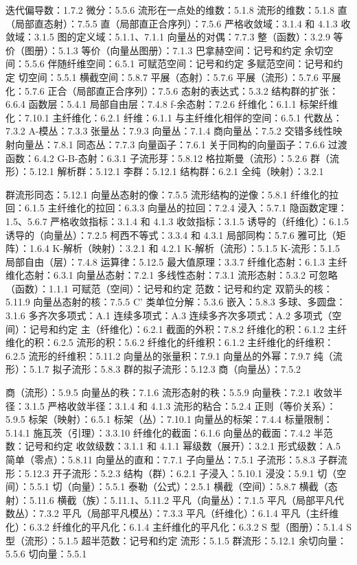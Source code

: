 迭代偏导数：1.7.2 微分：5.5.6 流形在一点处的维数：5.1.8 流形的维数：5.1.8 直（局部直态射）：7.5.5 直（局部直正合序列）：7.5.6 严格收敛域：3.1.4 和 4.1.3 收敛域：3.1.5 图的定义域：5.1.1、7.1.1 向量丛的对偶：7.7.3 整（函数）：3.2.9 等价（图册）：5.1.3 等价（向量丛图册）：7.1.3 巴拿赫空间：记号和约定 余切空间：5.5.6 伴随纤维空间：6.5.1 可赋范空间：记号和约定 多赋范空间：记号和约定 切空间：5.5.1 横截空间：5.8.7 平展（态射）：5.7.6 平展（流形）：5.7.6 平展化：5.7.6 正合（局部直正合序列）：7.5.6 态射的表达式：5.3.2 结构群的扩张：6.6.4 函数层：5.4.1 局部自由层：7.4.8 f-余态射：7.2.6 纤维化：6.1.1 标架纤维化：7.10.1 主纤维化：6.2.1 纤维：6.1.1 与主纤维化相伴的空间：6.5.1 代数丛：7.3.2 A-模丛：7.3.3 张量丛：7.9.3 向量丛：7.1.4 商向量丛：7.5.2 交错多线性映射向量丛：7.8.1 同态丛：7.7.3 向量函子：7.6.1 关于同构的向量函子：7.6.6 过渡函数：6.4.2 G-B-态射：6.3.1 子流形芽：5.8.12 格拉斯曼（流形）：5.2.6 群（流形）：5.12.1 解析群：5.12.1 李群：5.12.1 结构群：6.2.1 全纯（映射）：3.2.1

群流形同态：5.12.1 向量丛态射的像：7.5.5 流形结构的逆像：5.8.1 纤维化的拉回：6.1.5 主纤维化的拉回：6.3.3 向量丛的拉回：7.2.4 浸入：5.7.1 隐函数定理：1.5、5.6.7 严格收敛指标：3.1.4 和 4.1.3 收敛指标：3.1.5 诱导的（纤维化）：6.1.5 诱导的（向量丛）：7.2.5 柯西不等式：3.3.4 和 4.3.1 局部同构：5.7.6 雅可比（矩阵）：1.6.4 K-解析（映射）：3.2.1 和 4.2.1 K-解析（流形）：5.1.5 K-流形：5.1.5 局部自由（层）：7.4.8 运算律：5.12.5 最大值原理：3.3.7 纤维化态射：6.1.3 主纤维化态射：6.3.1 向量丛态射：7.2.1 多线性态射：7.3.1 流形态射：5.3.2 可忽略（函数）：1.1.1 可赋范（空间）：记号和约定 范数：记号和约定 双箭头的核：5.11.9 向量丛态射的核：7.5.5 C' 类单位分解：5.3.6 嵌入：5.8.3 多球、多圆盘：3.1.6 多齐次多项式：A.1 连续多项式：A.3 连续多齐次多项式：A.2 多项式（空间）：记号和约定 主（纤维化）：6.2.1 截面的外积：7.8.2 纤维化的积：6.1.2 主纤维化的积：6.2.5 流形的积：5.6.2 纤维化的纤维积：6.1.2 主纤维化的纤维积：6.2.5 流形的纤维积：5.11.2 向量丛的张量积：7.9.1 向量丛的外幂：7.9.7 纯（流形）：5.1.7 拟子流形：5.8.3 群的拟子流形：5.12.3 商（向量丛）：7.5.2

商（流形）：5.9.5 向量丛的秩：7.1.6 流形态射的秩：5.5.9 向量秩：7.2.1 收敛半径：3.1.5 严格收敛半径：3.1.4 和 4.1.3 流形的粘合：5.2.4 正则（等价关系）：5.9.5 标架（映射）：6.5.1 标架（丛）：7.10.1 向量丛的标架：7.4.4 标量限制：5.14.1 施瓦茨（引理）：3.3.10 纤维化的截面：6.1.6 向量丛的截面：7.4.2 半范数：记号和约定 收敛级数：3.1.1 和 4.1.1 幂级数（展开）：3.2.1 形式级数：A.5 简单（零点）：5.8.11 向量丛的直和：7.7.1 子向量丛：7.5.1 子流形：5.8.3 子群流形：5.12.3 开子流形：5.2.3 结构（群）：6.2.1 子浸入：5.10.1 浸没：5.9.1 切（空间）：5.5.1 切（向量）：5.5.1 泰勒（公式）：2.5.1 横截（空间）：5.8.7 横截（态射）：5.11.6 横截（族）：5.11.1、5.11.2 平凡（向量丛）：7.1.5 平凡（局部平凡代数丛）：7.3.2 平凡（局部平凡模丛）：7.3.3 平凡（纤维化）：6.1.4 平凡（主纤维化）：6.3.2 纤维化的平凡化：6.1.4 主纤维化的平凡化：6.3.2 S 型（图册）：5.1.4 S 型（流形）：5.1.5 超半范数：记号和约定 流形：5.1.5 群流形：5.12.1 余切向量：5.5.6 切向量：5.5.1


